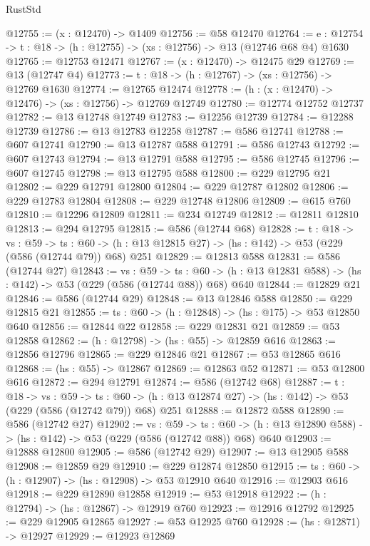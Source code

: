 \begin{lexlean}{RustStd}
\begin{coremodule}
@12755 := (x : @12470) -> @1409
@12756 := @58 @12470
@12764 := {e : @12754} -> {t : @18} -> (h : @12755) -> (xs : @12756) -> @13 (@12746 @68 @4) @1630
@12765 := @12753 @12471
@12767 := (x : @12470) -> @12475 @29
@12769 := @13 (@12747 @4)
@12773 := {t : @18} -> (h : @12767) -> (xs : @12756) -> @12769 @1630
@12774 := @12765 @12474
@12778 := (h : (x : @12470) -> @12476) -> (xs : @12756) -> @12769 @12749
@12780 := @12774 @12752 @12737
@12782 := @13 @12748 @12749
@12783 := @12256 @12739
@12784 := @12288 @12739
@12786 := @13 @12783 @12258
@12787 := @586 @12741
@12788 := @607 @12741
@12790 := @13 @12787 @588
@12791 := @586 @12743
@12792 := @607 @12743
@12794 := @13 @12791 @588
@12795 := @586 @12745
@12796 := @607 @12745
@12798 := @13 @12795 @588
@12800 := @229 @12795 @21
@12802 := @229 @12791 @12800
@12804 := @229 @12787 @12802
@12806 := @229 @12783 @12804
@12808 := @229 @12748 @12806
@12809 := @615 @760
@12810 := @12296 @12809
@12811 := @234 @12749
@12812 := @12811 @12810
@12813 := @294 @12795
@12815 := @586 (@12744 @68)
@12828 := {t : @18} ->
  {vs : @59} ->
  {ts : @60} -> (h : @13 @12815 @27) -> (hs : @142) -> @53 (@229 (@586 (@12744 @79)) @68) @251
@12829 := @12813 @588
@12831 := @586 (@12744 @27)
@12843 := {vs : @59} ->
  {ts : @60} -> (h : @13 @12831 @588) -> (hs : @142) -> @53 (@229 (@586 (@12744 @88)) @68) @640
@12844 := @12829 @21
@12846 := @586 (@12744 @29)
@12848 := @13 @12846 @588
@12850 := @229 @12815 @21
@12855 := {ts : @60} -> (h : @12848) -> (hs : @175) -> @53 @12850 @640
@12856 := @12844 @22
@12858 := @229 @12831 @21
@12859 := @53 @12858
@12862 := (h : @12798) -> (hs : @55) -> @12859 @616
@12863 := @12856 @12796
@12865 := @229 @12846 @21
@12867 := @53 @12865 @616
@12868 := (hs : @55) -> @12867
@12869 := @12863 @52
@12871 := @53 @12800 @616
@12872 := @294 @12791
@12874 := @586 (@12742 @68)
@12887 := {t : @18} ->
  {vs : @59} ->
  {ts : @60} -> (h : @13 @12874 @27) -> (hs : @142) -> @53 (@229 (@586 (@12742 @79)) @68) @251
@12888 := @12872 @588
@12890 := @586 (@12742 @27)
@12902 := {vs : @59} ->
  {ts : @60} -> (h : @13 @12890 @588) -> (hs : @142) -> @53 (@229 (@586 (@12742 @88)) @68) @640
@12903 := @12888 @12800
@12905 := @586 (@12742 @29)
@12907 := @13 @12905 @588
@12908 := @12859 @29
@12910 := @229 @12874 @12850
@12915 := {ts : @60} -> (h : @12907) -> (hs : @12908) -> @53 @12910 @640
@12916 := @12903 @616
@12918 := @229 @12890 @12858
@12919 := @53 @12918
@12922 := (h : @12794) -> (hs : @12867) -> @12919 @760
@12923 := @12916 @12792
@12925 := @229 @12905 @12865
@12927 := @53 @12925 @760
@12928 := (hs : @12871) -> @12927
@12929 := @12923 @12869

\end{coremodule}
\end{lexlean}
